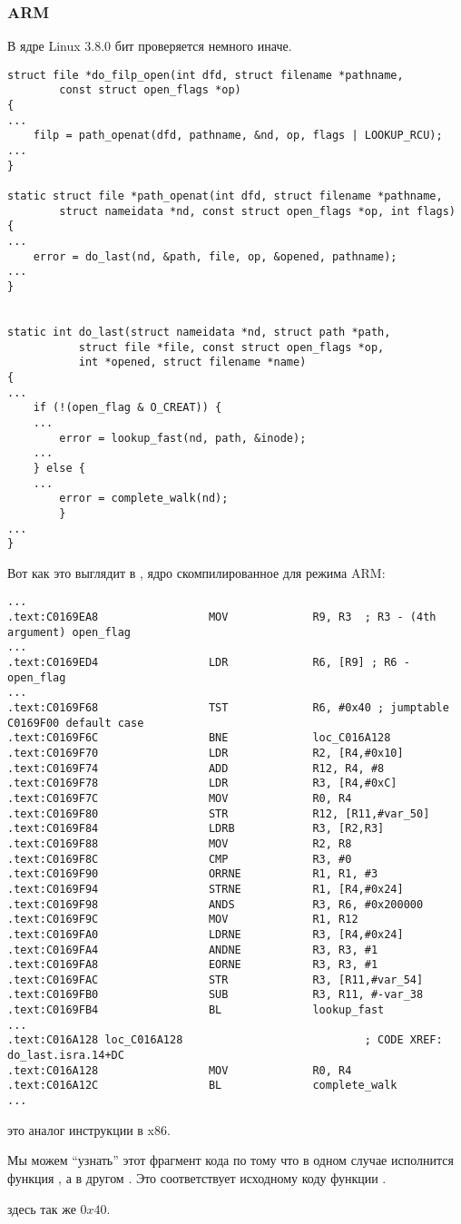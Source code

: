 \subsubsection{ARM}

В ядре Linux 3.8.0 бит  проверяется немного иначе.

\begin{lstlisting}[caption=linux kernel 3.8.0]
struct file *do_filp_open(int dfd, struct filename *pathname,
		const struct open_flags *op)
{
...
	filp = path_openat(dfd, pathname, &nd, op, flags | LOOKUP_RCU);
...
}

static struct file *path_openat(int dfd, struct filename *pathname,
		struct nameidata *nd, const struct open_flags *op, int flags)
{
...
	error = do_last(nd, &path, file, op, &opened, pathname);
...
}


static int do_last(struct nameidata *nd, struct path *path,
		   struct file *file, const struct open_flags *op,
		   int *opened, struct filename *name)
{
...
	if (!(open_flag & O_CREAT)) {
    ...
		error = lookup_fast(nd, path, &inode);
    ...
	} else {
    ...
		error = complete_walk(nd);
        }
...
}
\end{lstlisting}

Вот как это выглядит в \IDA, ядро скомпилированное для режима ARM:

\begin{lstlisting}[caption=do\_last() (vmlinux)]
...
.text:C0169EA8                 MOV             R9, R3  ; R3 - (4th argument) open_flag
...
.text:C0169ED4                 LDR             R6, [R9] ; R6 - open_flag
...
.text:C0169F68                 TST             R6, #0x40 ; jumptable C0169F00 default case
.text:C0169F6C                 BNE             loc_C016A128
.text:C0169F70                 LDR             R2, [R4,#0x10]
.text:C0169F74                 ADD             R12, R4, #8
.text:C0169F78                 LDR             R3, [R4,#0xC]
.text:C0169F7C                 MOV             R0, R4
.text:C0169F80                 STR             R12, [R11,#var_50]
.text:C0169F84                 LDRB            R3, [R2,R3]
.text:C0169F88                 MOV             R2, R8
.text:C0169F8C                 CMP             R3, #0
.text:C0169F90                 ORRNE           R1, R1, #3
.text:C0169F94                 STRNE           R1, [R4,#0x24]
.text:C0169F98                 ANDS            R3, R6, #0x200000
.text:C0169F9C                 MOV             R1, R12
.text:C0169FA0                 LDRNE           R3, [R4,#0x24]
.text:C0169FA4                 ANDNE           R3, R3, #1
.text:C0169FA8                 EORNE           R3, R3, #1
.text:C0169FAC                 STR             R3, [R11,#var_54]
.text:C0169FB0                 SUB             R3, R11, #-var_38
.text:C0169FB4                 BL              lookup_fast
...
.text:C016A128 loc_C016A128                            ; CODE XREF: do_last.isra.14+DC
.text:C016A128                 MOV             R0, R4
.text:C016A12C                 BL              complete_walk
...
\end{lstlisting}

 это аналог инструкции \TEST в x86.

Мы можем ``узнать'' этот фрагмент кода по тому что в одном случае исполнится функция ,
а в другом . Это соответствует исходному коду функции .

 здесь так же $0x40$.

